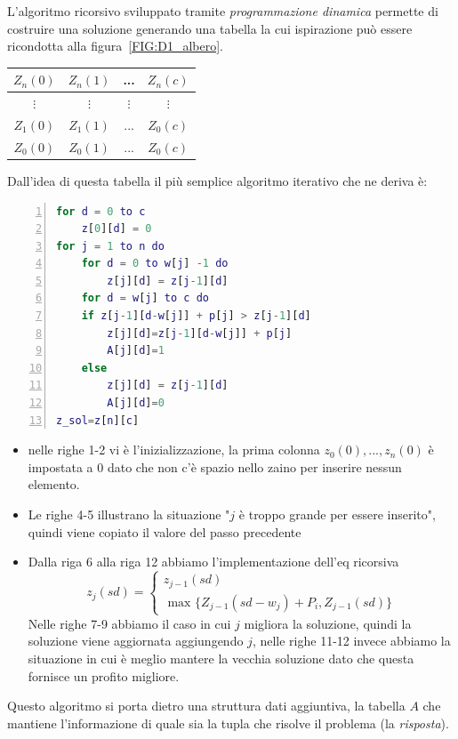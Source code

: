 \documentclass[a4paper]{article}
\begin{document}
L'algoritmo ricorsivo sviluppato tramite \textit{programmazione dinamica} permette di costruire una soluzione generando una tabella la cui ispirazione può essere ricondotta alla figura~\ref{FIG:D1_albero}.\\
\begin{center}
	\begin{tabular}{| c | c | c | c |}
  \hline
  $Z_n(0)$ & $Z_n(1)$ & ... &  $Z_n(c)$ \\
  \hline
  $ \vdots$ & $\vdots$ & $\vdots$ &  $\vdots $ \\
  \hline
  $Z_1(0)$ & $Z_1(1)$ & ... &  $Z_0(c)$ \\
  \hline
  $Z_0(0)$ & $Z_0(1)$ & ... &  $Z_0(c)$ \\
  \hline
	\end{tabular}
\end{center}
Dall'idea di questa tabella il più semplice algoritmo iterativo che ne deriva è:
\begin{lstlisting}[numbers=left,firstnumber=1,stepnumber=1, xleftmargin=15pt, language=Matlab ]
for d = 0 to c
    z[0][d] = 0
for j = 1 to n do
    for d = 0 to w[j] -1 do
    	z[j][d] = z[j-1][d]
    for d = w[j] to c do
	if z[j-1][d-w[j]] + p[j] > z[j-1][d] 
	    z[j][d]=z[j-1][d-w[j]] + p[j]
	    A[j][d]=1
	else
	    z[j][d] = z[j-1][d]
	    A[j][d]=0
z_sol=z[n][c]
\end{lstlisting}
\begin{itemize}
	\item nelle righe 1-2 vi è l'inizializzazione, la prima colonna $z_0(0),...,z_n(0)$ è impostata a 0 dato che non c'è spazio nello zaino per inserire nessun elemento.\\
	\item Le righe 4-5 illustrano la situazione "$j$ è troppo grande per essere inserito", quindi viene copiato il valore del passo precedente
	\item Dalla riga 6 alla riga 12 abbiamo l'implementazione dell'eq ricorsiva
	\begin{equation*}
        	z_j(sd)= \begin{cases} z_{j-1}(sd)\\
        	\text{ max } \{ Z_{j-1}(sd - w_j) + P_i , Z_{j-1}(sd) \}
	\end{cases}
	\end{equation*}
	Nelle righe 7-9 abbiamo il caso in cui $j$ migliora la soluzione, quindi la soluzione viene aggiornata aggiungendo $j$, nelle righe 11-12 invece abbiamo la situazione in cui è meglio mantere la vecchia soluzione dato che questa fornisce un profito migliore.
\end{itemize}
Questo algoritmo si porta dietro una struttura dati aggiuntiva, la tabella $A$ che mantiene l'informazione di quale sia la tupla che risolve il problema (la \textit{risposta}).
\end{document}
